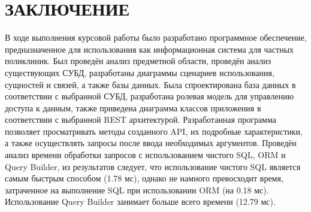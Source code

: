 \section*{\large ЗАКЛЮЧЕНИЕ}

В  ходе  выполнения  курсовой работы  было  разработано  программное обеспечение, предназначенное для использования как информационная система для частных поликлиник.
Был проведён анализ предметной области, проведён анализ существующих СУБД, разработаны диаграммы сценариев использования, сущностей и связей, а также базы данных.
Была спроектирована база данных в соответствии с выбранной СУБД, разработана ролевая модель для управлению доступа к данным,  также приведена диаграмма классов приложения в соответствии с выбранной REST архитектурой.
Разработанная программа позволяет просматривать методы созданного API, их подробные характеристики, а также осуществлять запросы после ввода необходимых аргументов.
Проведён анализ времени обработки запросов с использованием чистого SQL, ORM и Query Builder, из результатов следует, что использование чистого SQL является самым быстрым способом (1.78 мс), однако не намного превосходит время, затраченное на выполнение SQL при использовании ORM (на 0.18 мс). Использование Query Builder занимает больше всего времени (12.79 мс).

\pagebreak